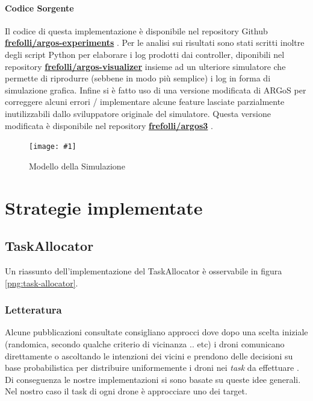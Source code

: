 \documentclass[a4paper,11pt,oneside, table]{article}
\newcommand{\putimage}[4] {
	\begin{figure}[H]
	    \centering
	    \texttt{[image: \#1]}
	    \caption{#2}\label{#3}
	\end{figure}
}
\begin{document}
\paragraph{Codice Sorgente}

Il codice di questa implementazione \`e disponibile nel repository Github \textbf{\href{http://github.com/frefolli/argos-experiments}{frefolli/argos-experiments}} \cite{RF:AE}.
Per le analisi sui risultati sono stati scritti inoltre degli script Python per elaborare i log prodotti dai controller, diponibili nel repository \textbf{\href{http://github.com/frefolli/argos-visualizer}{frefolli/argos-visualizer}} \cite{RF:AV} insieme ad un ulteriore simulatore che permette di riprodurre (sebbene in modo pi\`u semplice) i log in forma di simulazione grafica.
Infine si \`e fatto uso di una versione modificata di ARGoS per correggere alcuni errori / implementare alcune feature lasciate parzialmente inutilizzabili dallo sviluppatore originale del simulatore. Questa versione modificata \`e disponibile nel repository \textbf{\href{http://github.com/frefolli/argos3}{frefolli/argos3}} \cite{RF:A3}.

\putimage{images/simulation-model.png}{Modello della Simulazione}{png:simulation-model}{0.99}

\section{Strategie implementate}

\subsection{TaskAllocator}

Un riassunto dell'implementazione del TaskAllocator \`e osservabile in figura \ref{png:task-allocator}.

\subsubsection{Letteratura}

Alcune pubblicazioni consultate \cite{mclurkin2005dynamic} \cite{gaerther2013uav} consigliano approcci dove dopo una scelta iniziale (randomica, secondo qualche criterio di vicinanza .. etc) i droni comunicano direttamente o ascoltando le intenzioni dei vicini e prendono delle decisioni su base probabilistica per distribuire uniformemente i droni nei \textit{task} da effettuare .
Di conseguenza le nostre implementazioni si sono basate su queste idee generali. Nel nostro caso il task di ogni drone \`e approcciare uno dei target.
\end{document}
